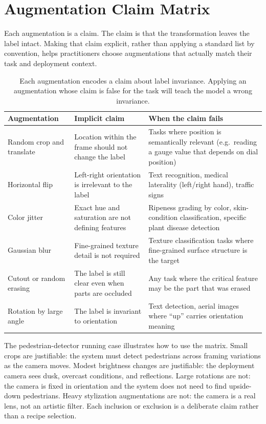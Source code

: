 \section{Augmentation Claim Matrix}

Each augmentation is a claim. The claim is that the transformation leaves the label intact. Making that claim explicit, rather than applying a standard list by convention, helps practitioners choose augmentations that actually match their task and deployment context.

\begin{table}[t]
\centering
\small
\setlength{\tabcolsep}{4pt}
\begin{tabular}{p{2.47cm}p{4.11cm}p{3.37cm}}
\toprule
Augmentation & Implicit claim & When the claim fails \\
\midrule
Random crop and translate & Location within the frame should not change the label & Tasks where position is semantically relevant (e.g.\ reading a gauge value that depends on dial position) \\
Horizontal flip & Left-right orientation is irrelevant to the label & Text recognition, medical laterality (left/right hand), traffic signs \\
Color jitter & Exact hue and saturation are not defining features & Ripeness grading by color, skin-condition classification, specific plant disease detection \\
Gaussian blur & Fine-grained texture detail is not required & Texture classification tasks where fine-grained surface structure is the target \\
Cutout or random erasing & The label is still clear even when parts are occluded & Any task where the critical feature may be the part that was erased \\
Rotation by large angle & The label is invariant to orientation & Text detection, aerial images where ``up'' carries orientation meaning \\
\bottomrule
\end{tabular}
\caption{Each augmentation encodes a claim about label invariance. Applying an augmentation whose claim is false for the task will teach the model a wrong invariance.}
\label{tab:augmentation-claims}
\end{table}

The pedestrian-detector running case illustrates how to use the matrix. Small crops are justifiable: the system must detect pedestrians across framing variations as the camera moves. Modest brightness changes are justifiable: the deployment camera sees dusk, overcast conditions, and reflections. Large rotations are not: the camera is fixed in orientation and the system does not need to find upside-down pedestrians. Heavy stylization augmentations are not: the camera is a real lens, not an artistic filter. Each inclusion or exclusion is a deliberate claim rather than a recipe selection.

